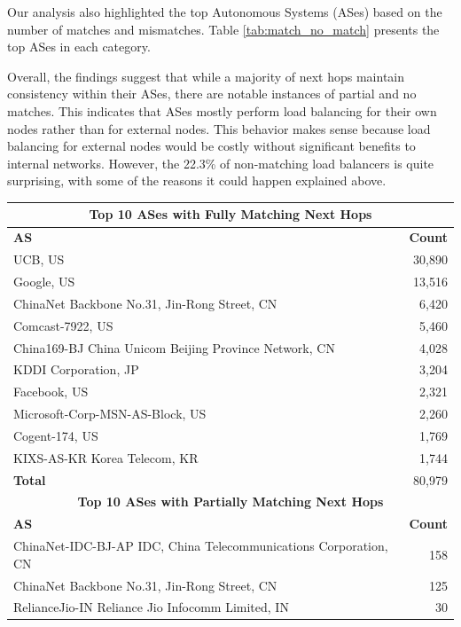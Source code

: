 \documentclass[12pt]{cwru_thesis}
\begin{document}
Our analysis also highlighted the top Autonomous Systems (ASes) based on the number of matches and mismatches. Table \ref{tab:match_no_match} presents the top ASes in each category.

Overall, the findings suggest that while a majority of next hops maintain consistency within their ASes, there are notable instances of partial and no matches. This indicates that ASes mostly perform load balancing for their own nodes rather than for external nodes. This behavior makes sense because load balancing for external nodes would be costly without significant benefits to internal networks. However, the 22.3\% of non-matching load balancers is quite surprising, with some of the reasons it could happen explained above. 


\begin{table}[h!]
    \centering
    \begin{tabular}{|l|r|}
        \hline
        \multicolumn{2}{|c|}{\textbf{Top 10 ASes with Fully Matching Next Hops}} \\
        \hline
        \textbf{AS} & \textbf{Count} \\
        \hline
        UCB, US & 30,890 \\
        Google, US & 13,516 \\
        ChinaNet Backbone No.31, Jin-Rong Street, CN & 6,420 \\
        Comcast-7922, US & 5,460 \\
        China169-BJ China Unicom Beijing Province Network, CN & 4,028 \\
        KDDI Corporation, JP & 3,204 \\
        Facebook, US & 2,321 \\
        Microsoft-Corp-MSN-AS-Block, US & 2,260 \\
        Cogent-174, US & 1,769 \\
        KIXS-AS-KR Korea Telecom, KR & 1,744 \\
        \hline
        \textbf{Total} & 80,979 \\
        \hline
        \multicolumn{2}{|c|}{\textbf{Top 10 ASes with Partially Matching Next Hops}} \\
        \hline
        \textbf{AS} & \textbf{Count} \\
        \hline
        ChinaNet-IDC-BJ-AP IDC, China Telecommunications Corporation, CN & 158 \\
        ChinaNet Backbone No.31, Jin-Rong Street, CN & 125 \\
        RelianceJio-IN Reliance Jio Infocomm Limited, IN & 30 \\

\end{tabular}
\end{table}
\end{document}
